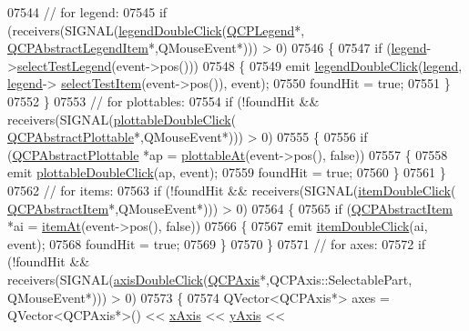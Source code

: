 \begin{DoxyCode}
07544   \textcolor{comment}{// for legend:}
07545   \textcolor{keywordflow}{if} (receivers(SIGNAL(\hyperlink{a00116_a0250f835c044521df1619b132288bca7}{legendDoubleClick}(\hyperlink{a00045}{QCPLegend}*,
      \hyperlink{a00023}{QCPAbstractLegendItem}*,QMouseEvent*))) > 0)
07546   \{
07547     \textcolor{keywordflow}{if} (\hyperlink{a00116_a75acd427ec48e9a9d2ae6a17817cc490}{legend}->\hyperlink{a00045_a6388446e0906b21ebf3a92310570e73e}{selectTestLegend}(event->pos()))
07548     \{
07549       emit \hyperlink{a00116_a0250f835c044521df1619b132288bca7}{legendDoubleClick}(\hyperlink{a00116_a75acd427ec48e9a9d2ae6a17817cc490}{legend}, \hyperlink{a00116_a75acd427ec48e9a9d2ae6a17817cc490}{legend}->
      \hyperlink{a00045_a8bbb0b003cc93f07dff1d69416b606f0}{selectTestItem}(event->pos()), event);
07550       foundHit = \textcolor{keyword}{true};
07551     \}
07552   \}
07553   \textcolor{comment}{// for plottables:}
07554   \textcolor{keywordflow}{if} (!foundHit && receivers(SIGNAL(\hyperlink{a00116_af2e6f1cea923dae437681d01ce7d0c31}{plottableDoubleClick}(
      \hyperlink{a00024}{QCPAbstractPlottable}*,QMouseEvent*))) > 0)
07555   \{
07556     \textcolor{keywordflow}{if} (\hyperlink{a00024}{QCPAbstractPlottable} *ap = \hyperlink{a00116_ac1d1bc6ae4e13616fb02cef6d9e2188e}{plottableAt}(event->pos(), \textcolor{keyword}{false}))
07557     \{
07558       emit \hyperlink{a00116_af2e6f1cea923dae437681d01ce7d0c31}{plottableDoubleClick}(ap, event);
07559       foundHit = \textcolor{keyword}{true};
07560     \}
07561   \}
07562   \textcolor{comment}{// for items:}
07563   \textcolor{keywordflow}{if} (!foundHit && receivers(SIGNAL(\hyperlink{a00116_ac83aa9f5a3e9bb3efc9cdc763dcd42a6}{itemDoubleClick}(
      \hyperlink{a00022}{QCPAbstractItem}*,QMouseEvent*))) > 0)
07564   \{
07565     \textcolor{keywordflow}{if} (\hyperlink{a00022}{QCPAbstractItem} *ai = \hyperlink{a00116_a793e4b04e0ede11a733021907368fa83}{itemAt}(event->pos(), \textcolor{keyword}{false}))
07566     \{
07567       emit \hyperlink{a00116_ac83aa9f5a3e9bb3efc9cdc763dcd42a6}{itemDoubleClick}(ai, event);
07568       foundHit = \textcolor{keyword}{true};
07569     \}
07570   \}
07571   \textcolor{comment}{// for axes:}
07572   \textcolor{keywordflow}{if} (!foundHit && receivers(SIGNAL(\hyperlink{a00116_a6df35357460181a72da3e93d600f5256}{axisDoubleClick}(\hyperlink{a00025}{QCPAxis}*,QCPAxis::SelectablePart,
      QMouseEvent*))) > 0)
07573   \{
07574     QVector<QCPAxis*> axes = QVector<QCPAxis*>() << \hyperlink{a00116_a384438707adbcc96b0fa1324106f7129}{xAxis} << \hyperlink{a00116_af168096ce67002b1fbce18ae5dd1b652}{yAxis} << 

\end{DoxyCode}
